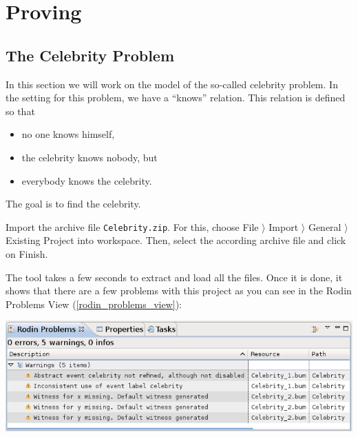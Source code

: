 \section{Proving}
\label{tutorial_08}


\subsection{The Celebrity Problem}

In this section we will work on the model of the so-called celebrity problem. In the setting for this problem, we have a ``knows'' relation. This relation is defined so that

\begin{itemize}
	\item no one knows himself,
	\item the celebrity knows nobody, but
	\item everybody knows the celebrity.
\end{itemize}    

The goal is to find the celebrity.


Import the archive file \texttt{Celebrity.zip}. For this, choose \textsf{File $\rangle $ Import $\rangle $ General $\rangle $ Existing Project into workspace}. Then, select the according archive file and click on \textsf{Finish}.

The tool takes a few seconds to extract and load all the files. Once it is done, it shows that there are a few problems with this project as you can see in the Rodin Problems View (\ref{rodin_problems_view}):

\begin{center}
	\includegraphics{img/tutorial/tut_08_rodin_problems.png}
\end{center}

